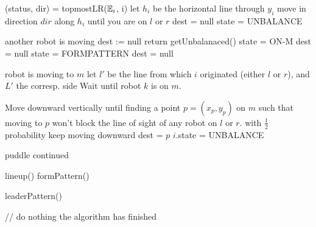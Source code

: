 \documentclass[preprint,10pt]{elsarticle}
\begin{document}
	\begin{algorithm}[H]
	\begin{algorithmic}[1]

					\State (status, dir) = topmostLR($\mathbb{E}_i$, i)
						\State let $h_i$ be the horizontal line through $y_i$
						\State move in direction $dir$ along $h_i$ until you are on $l$ or $r$
					\EndIf
				\Else
					\State dest = null
				\EndIf
					\State state = UNBALANCE
				\EndIf
			\EndCase

			\State
				 \Comment another robot is moving
					\State dest := null
					\State return
				\EndIf
					\State getUnbalanaced()
					\State state = ON-M
					\State dest = null
				\Else
					\State state = FORMPATTERN
					\State dest = null
				\EndIf
			\EndCase

				\Comment robot is moving to $m$
					\State let $l'$ be the line from which $i$ originated (either $l$ or $r$), and $L'$ the corresp. side
						\State Wait until robot $k$ is on $m$.
					\EndWhile

					\State Move downward vertically until finding a point $p = (x_p, y_p)$ on $m$ such that 
						moving to $p$ won't block the line of sight of any robot on $l$ or $r$.
						\State with $\frac{1}{2}$ probability keep moving downward
					\EndIf
						\State dest = $p$
						\State $i$.state = UNBALANCE
			\EndCase
			\State
	\EndProcedure
	\end{algorithmic}
	\end{algorithm}

	\clearpage %

	\begin{algorithm}[H]
	\begin{algorithmic}
		\caption{puddle continued}

			\State
				\State lineup()
				\State formPattern()
			\EndCase

			\State
				\State leaderPattern()
			\EndCase

			\State
				\State // do nothing the algorithm has finished
			\EndCase
		\EndSwitch

	\EndProcedure
	\end{algorithmic}
	\end{algorithm}
	
\end{document}
